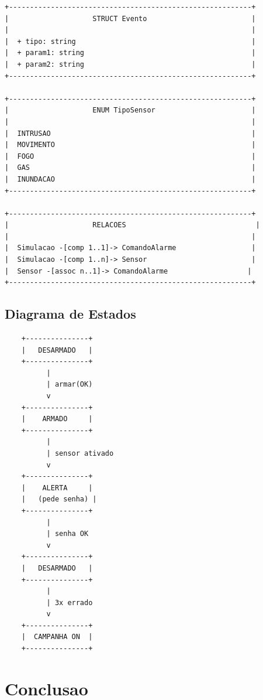 \documentclass[12pt,a4paper]{article}
\begin{document}
\begin{verbatim}
+----------------------------------------------------------+
|                    STRUCT Evento                         |
|                                                          |
|  + tipo: string                                          |
|  + param1: string                                        |
|  + param2: string                                        |
+----------------------------------------------------------+

+----------------------------------------------------------+
|                    ENUM TipoSensor                       |
|                                                          |
|  INTRUSAO                                                |
|  MOVIMENTO                                               |
|  FOGO                                                    |
|  GAS                                                     |
|  INUNDACAO                                               |
+----------------------------------------------------------+

+----------------------------------------------------------+
|                    RELACOES                               |
|                                                          |
|  Simulacao -[comp 1..1]-> ComandoAlarme                  |
|  Simulacao -[comp 1..n]-> Sensor                         |
|  Sensor -[assoc n..1]-> ComandoAlarme                   |
+----------------------------------------------------------+
\end{verbatim}

\subsection{Diagrama de Estados}

\begin{verbatim}
    +---------------+
    |   DESARMADO   |
    +---------------+
          |
          | armar(OK)
          v
    +---------------+
    |    ARMADO     |
    +---------------+
          |
          | sensor ativado
          v
    +---------------+
    |    ALERTA     |
    |   (pede senha) |
    +---------------+
          |
          | senha OK
          v
    +---------------+
    |   DESARMADO   |
    +---------------+
          |
          | 3x errado
          v
    +---------------+
    |  CAMPANHA ON  |
    +---------------+
\end{verbatim}

\newpage

\section{Conclusao}
\end{document}
